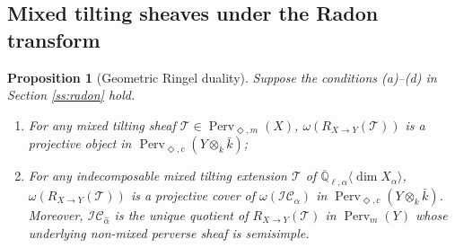 \documentclass{amsart}
\theoremstyle{plain}
\newtheorem{prop}[subsubsection]{Proposition}
\theoremstyle{definition}
\theoremstyle{remark}
\numberwithin{equation}{subsection}
\begin{document}
\subsection{Mixed tilting sheaves under the Radon transform}
\begin{prop}[Geometric Ringel duality]\label{p:tiltproj}
Suppose the conditions (a)--(d) in Section \ref{ss:radon} hold. 
\begin{enumerate}[(1)]
\item For any mixed tilting sheaf ${\mathcal{T}}\in{\operatorname{Perv}_{\Diamond,m}({X})}$, $\omega(R_{X\to Y}({\mathcal{T}}))$ is a projective object in ${\operatorname{Perv}_{\Diamond,c}({{{Y}}\otimes_k\bar{k}})}$;
\item For any indecomposable mixed tilting extension ${\mathcal{T}}$ of ${\overline{\mathbb{Q}}_{\ell,\alpha}{\langle{{\dim X_\alpha}}\rangle}}$, \newline $\omega(R_{X\to Y}({\mathcal{T}}))$ is a projective cover of $\omega({\mathcal{IC}}_{\hat{\alpha}})$ in ${\operatorname{Perv}_{\Diamond,c}({{{Y}}\otimes_k\bar{k}})}$. Moreover, ${\mathcal{IC}}_{\hat{\alpha}}$ is the unique quotient of $R_{X\to Y}({\mathcal{T}})$ in ${\operatorname{Perv}_m({Y})}$ whose underlying non-mixed perverse sheaf is semisimple.
\end{enumerate}
\end{prop}
\end{document}
